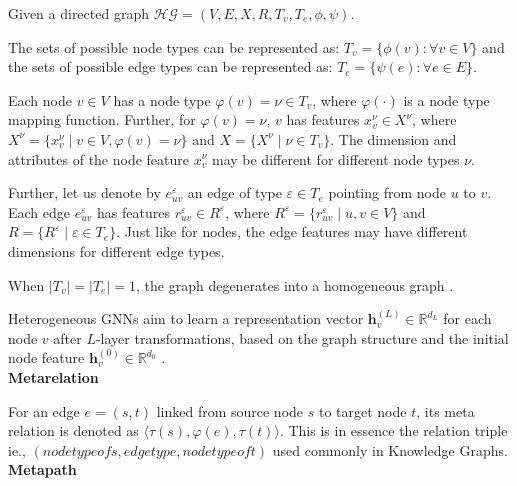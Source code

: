 \documentclass{report} %
\begin{document}
Given a directed graph \( \mathcal{HG} = (V, E, X, R, T_v, T_e, \phi, \psi) \).

The sets of possible node types can be represented as: \( T_v = \{ \phi(v) : \forall v \in V \} \) and the sets of possible edge types 
can be represented as: \( T_e = \{ \psi(e) : \forall e \in E \}.\) 

Each node \( v \in V \) has a node type \( \varphi(v) = \nu \in T_v \), where \( \varphi(\cdot) \) is a node type mapping function. 
Further, for \( \varphi(v) = \nu \), \( v \) has features \( x_v^{\nu} \in X^{\nu} \), 
where \( X^{\nu} = \{ x_v^{\nu} \mid v \in V, \varphi(v) = \nu \} \) and \( X = \{ X^{\nu} \mid \nu \in T_v \} \). 
The dimension and attributes of the node feature \( x_v^{\nu} \) may be different for different node types \( \nu \). 

Further, let us denote by \( e_{uv}^{\varepsilon} \) an edge of type \( \varepsilon \in T_e \) pointing from node \( u \) to \( v \). 
Each edge \( e_{uv}^{\varepsilon} \) has features \( r_{uv}^{\varepsilon} \in R^{\varepsilon} \), 
where \( R^{\varepsilon} = \{ r_{uv}^{\varepsilon} \mid u, v \in V \} \) and \( R = \{ R^{\varepsilon} \mid \varepsilon \in T_e \} \). 
Just like for nodes, the edge features may have different dimensions for different edge types.

When \( |T_v| = |T_e| = 1 \), the graph degenerates into a homogeneous graph \cite{SE HGNN-2023}.

Heterogeneous \ac{GNN}s aim to learn a representation vector \( \mathbf{h}^{(L)}_v \in \mathbb{R}^{d_L} \) for each node \( v \) after \( L \)-layer transformations, 
based on the graph structure and the initial node feature \( \mathbf{h}^{(0)}_v \in \mathbb{R}^{d_0} \) \cite{REF HGNN-2021}.\\

\textbf{Metarelation}

For an edge \( e = (s, t) \) linked from source node \( s \) to target node \( t \), its meta relation is denoted as
\(
\langle \tau(s), \varphi(e), \tau(t) \rangle.
\)
This is in essence the relation triple ie.,  \(  (node type of s, edge type, node type of t) \) used commonly in Knowledge Graphs.\\

\textbf{Metapath}
\end{document}
